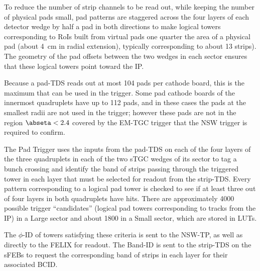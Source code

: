 \documentclass[cernpreprint, atlasdraft=false, UKenglish,british,orcidlogo, texmf, orcidlogo]{atlasdoc}
\begin{document}
To reduce the number of strip channels to be read out, while keeping the number of physical pads small, pad patterns are staggered across the four layers of each detector wedge by half a pad in both directions
to make logical towers corresponding to \glspl{RoI} built from virtual pads one quarter the area of a physical pad (about \SI{4}{\cm} in radial extension), typically corresponding to about 13 strips). The geometry of the pad offsets between the two wedges in each sector ensures that these logical towers point toward the \gls{IP}.
 
Because a pad-\gls{TDS} reads out at most \num{104} pads per cathode board, this is the maximum that can be used in the trigger. Some pad cathode boards of the innermost quadruplets have up to \num{112} pads, and in these cases the pads at the smallest radii are not used in the trigger; however these pads are not in the region $\abseta <2.4$ covered by the \gls{EM-TGC} trigger that the \gls{NSW} trigger is required to confirm.
 
The Pad Trigger uses the inputs from the pad-\gls{TDS} on each of the four layers of the three quadruplets in each of the two \gls{sTGC} wedges of its sector to tag a bunch crossing and identify the band of strips passing through the triggered tower in each layer that must be selected for readout from the strip-\gls{TDS}.
Every pattern corresponding to a logical pad tower is checked to see if at least three out of four layers in both quadruplets have hits. 
There are approximately \num{4000} possible trigger ``candidates'' (logical pad towers corresponding to tracks from the \gls{IP}) in a Large sector and about \num{1800} in a Small sector, which are stored in \glspl{LUT}.
 
The $\phi$-ID of towers satisfying these criteria is sent to the \gls{NSW-TP}, as well as directly to the \gls{FELIX} for readout.
The Band-ID is sent to the strip-\gls{TDS} on the \glspl{sFEB} to request the corresponding band of strips in each layer for their associated \gls{BCID}.
 
\end{document}
